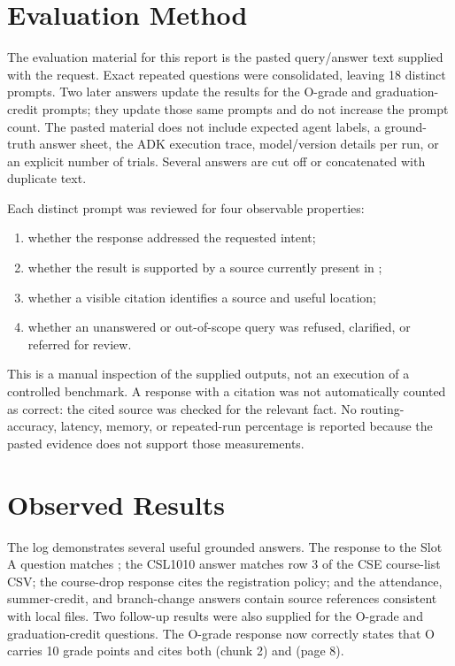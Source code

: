 \documentclass[11pt,a4paper]{article}
\begin{document}
\section{Evaluation Method}
The evaluation material for this report is the pasted query/answer text supplied with the request. Exact repeated questions were consolidated, leaving 18 distinct prompts. Two later answers update the results for the O-grade and graduation-credit prompts; they update those same prompts and do not increase the prompt count. The pasted material does not include expected agent labels, a ground-truth answer sheet, the ADK execution trace, model/version details per run, or an explicit number of trials. Several answers are cut off or concatenated with duplicate text.

Each distinct prompt was reviewed for four observable properties:
\begin{enumerate}
  \item whether the response addressed the requested intent;
  \item whether the result is supported by a source currently present in ;
  \item whether a visible citation identifies a source and useful location;
  \item whether an unanswered or out-of-scope query was refused, clarified, or referred for review.
\end{enumerate}

This is a manual inspection of the supplied outputs, not an execution of a controlled benchmark. A response with a citation was not automatically counted as correct: the cited source was checked for the relevant fact. No routing-accuracy, latency, memory, or repeated-run percentage is reported because the pasted evidence does not support those measurements.

\section{Observed Results}
The log demonstrates several useful grounded answers. The response to the Slot A question matches ; the CSL1010 answer matches row 3 of the CSE course-list CSV; the course-drop response cites the registration policy; and the attendance, summer-credit, and branch-change answers contain source references consistent with local files. Two follow-up results were also supplied for the O-grade and graduation-credit questions. The O-grade response now correctly states that O carries 10 grade points and cites both  (chunk 2) and  (page 8).
\end{document}
